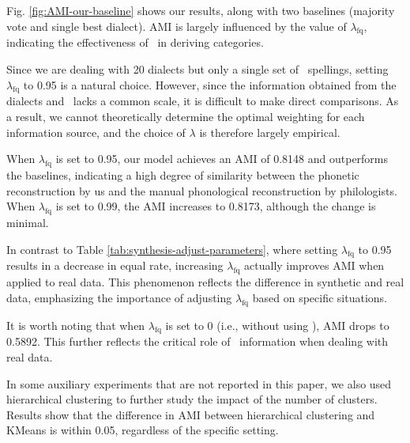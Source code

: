 Fig. \ref{fig:AMI-our-baseline} shows our results, along with two baselines (majority vote and single best dialect).
AMI is largely influenced by the value of $\lambda_{\text{fq}}$, indicating the effectiveness of \fq~in deriving categories. 


Since we are dealing with 20 dialects but only a single set of \fq~spellings, setting $\lambda_{\text{fq}}$ to 0.95 is a natural choice. 
However, since the information obtained from the dialects and \fq~lacks a common scale, it is difficult to make direct comparisons.
As a result, we cannot theoretically determine the optimal weighting for each information source, and the choice of $\lambda$ is therefore largely empirical. 

When $\lambda_{\text{fq}}$ is set to 0.95, our model achieves an AMI of 0.8148 and outperforms the baselines, indicating a high degree of similarity between the phonetic reconstruction by us and the manual phonological reconstruction by philologists. 
When $\lambda_{\text{fq}}$ is set to 0.99, the AMI increases to 0.8173, although the change is minimal.


In contrast to Table \ref{tab:synthesis-adjust-parameters}, where setting $\lambda_{\text{fq}}$ to 0.95 results in a decrease in equal rate, increasing $\lambda_{\text{fq}}$ actually improves AMI when applied to real data. This phenomenon reflects the difference in synthetic and real data, emphasizing the importance of adjusting $\lambda_{\text{fq}}$ based on specific situations.

It is worth noting that when $\lambda_{\text{fq}}$ is set to 0 (i.e., without using \fq), AMI drops to 0.5892. This further reflects the critical role of \fq~information when dealing with real data.



In some auxiliary experiments that are not reported in this paper, we also used hierarchical clustering to further study the impact of the number of clusters. Results show that the difference in AMI between hierarchical clustering and KMeans is within 0.05, regardless of the specific setting.

